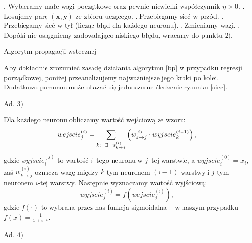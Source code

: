 \documentclass{mini}
\begin{document}
\begin{algorithm}
\begin{algorithmic}
\STATE
{}. Wybieramy małe wagi początkowe oraz pewnie niewielki współczynnik $\eta>0$.
\STATE
{}. Losujemy parę $(\textbf{x},\textbf{y})$ ze zbioru uczącego.
\STATE
{}. Przebiegamy sieć w przód.
\STATE
{}. Przebiegamy sieć w tył (licząc błąd dla każdego neuronu).
\STATE
{}. Zmieniamy wagi.
\STATE
{}. Dopóki nie osiągniemy zadowalająco niskiego błędu, wracamy do punktu $2)$.
\end{algorithmic}
\caption{Algorytm propagacji wstecznej}
\label{bp}
\end{algorithm}


Aby dokładnie zrozumieć zasadę działania algorytmu \ref{bp} w przypadku regresji porządkowej, poniżej przeanalizujemy najważniejsze jego kroki po kolei. Dodatkowo pomocne może okazać się jednoczesne śledzenie rysunku \ref{siec}. 

\underline{Ad. $3)$} 

Dla każdego neuronu obliczamy wartość wejściową ze wzoru:
$$
wejscie_j^{(i)} = \sum_{k:\hspace{2mm}\exists\hspace{2mm} w^{(i)}_{k\rightarrow j}} \left( w^{(i)}_{k\rightarrow j}\cdot wyjscie_k^{(i-1)} \right),
$$
gdzie $wyjscie_i^{(j)}$ to wartość $i$--tego neuronu w $j$--tej warstwie, a $wyjscie_i^{(0)} = x_i$, zaś $w^{(i)}_{k\rightarrow j}$ oznacza wagę między $k$-tym neuronem $(i-1)$-warstwy i $j$-tym neuronem $i$-tej warstwy. Następnie wyznaczamy wartość wyjściową:
$$
wyjscie_j^{(i)} = f\left(wejscie_j^{(i)}\right),
$$
gdzie $f(\cdot)$ to wybrana przez nas funkcja sigmoidalna -- w naszym przypadku $f(x) = \frac{1}{1+e^{-x}}$.

\underline{Ad. $4)$}
\end{document}
